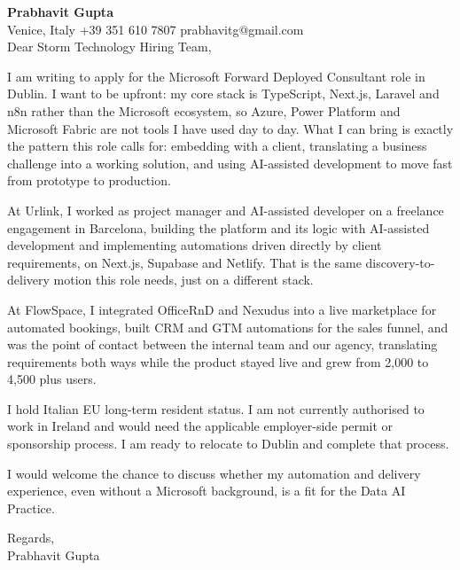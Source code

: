 \documentclass[a4paper,10.5pt]{article}
\begin{document}
\textbf{Prabhavit Gupta}\\
Venice, Italy \textbar{} +39 351 610 7807 \textbar{} prabhavitg@gmail.com\\[10pt]
Dear Storm Technology Hiring Team,

I am writing to apply for the Microsoft Forward Deployed Consultant role in Dublin. I want to be upfront: my core stack is TypeScript, Next.js, Laravel and n8n rather than the Microsoft ecosystem, so Azure, Power Platform and Microsoft Fabric are not tools I have used day to day. What I can bring is exactly the pattern this role calls for: embedding with a client, translating a business challenge into a working solution, and using AI-assisted development to move fast from prototype to production.

At Urlink, I worked as project manager and AI-assisted developer on a freelance engagement in Barcelona, building the platform and its logic with AI-assisted development and implementing automations driven directly by client requirements, on Next.js, Supabase and Netlify. That is the same discovery-to-delivery motion this role needs, just on a different stack.

At FlowSpace, I integrated OfficeRnD and Nexudus into a live marketplace for automated bookings, built CRM and GTM automations for the sales funnel, and was the point of contact between the internal team and our agency, translating requirements both ways while the product stayed live and grew from 2,000 to 4,500 plus users.

I hold Italian EU long-term resident status. I am not currently authorised to work in Ireland and would need the applicable employer-side permit or sponsorship process. I am ready to relocate to Dublin and complete that process.

I would welcome the chance to discuss whether my automation and delivery experience, even without a Microsoft background, is a fit for the Data AI Practice.

Regards,\\
Prabhavit Gupta
\end{document}
